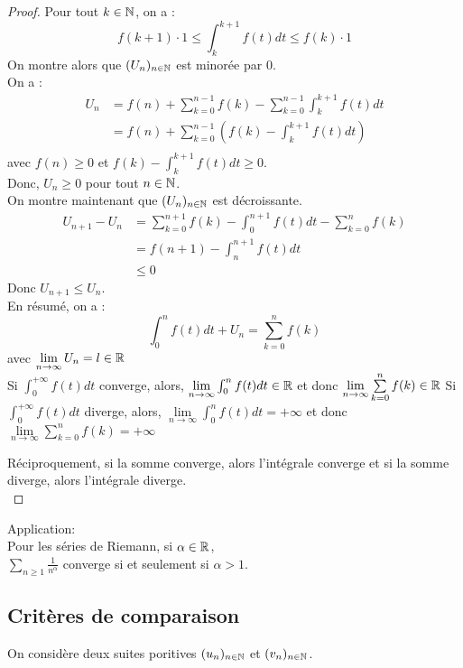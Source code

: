 \documentclass[../main.tex]{subfile}
\begin{document}
\begin{proof}
	Pour tout $k \in \mathbb{N}$, on a :
	$$f(k+1) \cdot 1 \leq \int_k^{k+1} f(t) dt \leq f(k) \cdot 1$$
	On montre alors que $(U_n)_{n \in \mathbb{N}}$ est minorée par $0$.\\
	On a :
	$$
\begin{aligned}
	U_n &= f(n) + \sum\limits_{k = 0}^{n-1} f(k) - \sum\limits_{k=0}^{n-1} \int_{k}^{k+1} f(t) dt\\
	&= f(n) + \sum\limits_{k = 0}^{n-1} (f(k) - \int_{k}^{k+1} f(t) dt)\\
\end{aligned}
	$$
	avec $f(n) \geq 0$ et $f(k) - \int_k^{k+1} f(t)dt \geq 0$.\\
	Donc, $U_n \geq 0$ pour tout $n \in \mathbb{N}$.\\
	On montre maintenant que $(U_n)_{n \in \mathbb{N}}$ est décroissante.\\
	$$
\begin{aligned}
	U_{n+1} - U_n &= \sum\limits_{k =0}^{n+1} f(k) - \int_0^{n+1} f(t)dt - \sum\limits_{k=0}^n f(k)\\
	&= f(n+1) - \int_n^{n+1} f(t)dt\\
	&\leq 0
\end{aligned}
	$$
	Donc $U_{n+1} \leq U_n$.\\

	En résumé, on a :
	$$\int_0^n f(t)dt + U_n = \sum\limits_{k=0}^n f(k)$$
	avec $\lim\limits_{n \to \infty} U_n = l \in \mathbb{R}$\\
	Si $\int_0^{+\infty} f(t)dt$ converge, alors, $\lim\limits_{n\to \infty} \int_0^n f(t)dt \in \mathbb{R}$ et donc $\lim\limits_{n \to \infty} \sum\limits_{k=0}^n f(k) \in \mathbb{R}$
	Si $\int_0^{+\infty} f(t)dt$ diverge, alors, $\lim\limits_{n\to \infty} \int_0^n f(t)dt = +\infty$ et donc $\lim\limits_{n \to \infty} \sum\limits_{k=0}^n f(k) = +\infty$

	Réciproquement, si la somme converge, alors l'intégrale converge et si la somme diverge, alors l'intégrale diverge.\\
\end{proof}

Application:\\
Pour les séries de Riemann, si $\alpha \in \mathbb{R}$, \\
$\sum\limits_{n \geq 1} \frac{1}{n^\alpha}$ converge si et seulement si $\alpha > 1$.\\



\subsection{Critères de comparaison}
On considère deux suites poritives $(u_n)_{n\in \mathbb{N}}$ et $(v_n)_{n \in \mathbb{N}}$.\\
\end{document}

